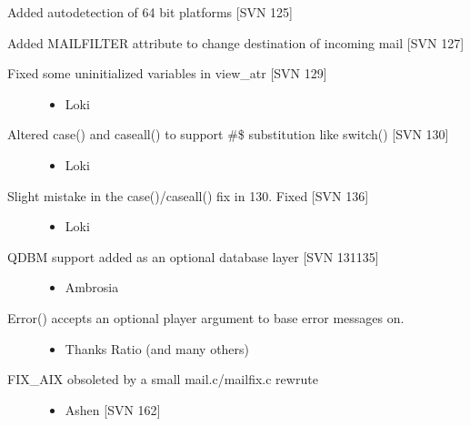 \documentclass[letterpaper,10pt,english]{sphinxmanual}
\begin{document}
\sphinxAtStartPar
Added auto\sphinxhyphen{}detection of 64 bit platforms {[}SVN 125{]}

\sphinxAtStartPar
Added MAILFILTER attribute to change destination of incoming mail {[}SVN 127{]}
\begin{description}
\item[{Fixed some uninitialized variables in view\_atr {[}SVN 129{]}}] \leavevmode\begin{itemize}
\item {} 
\sphinxAtStartPar
Loki

\end{itemize}

\item[{Altered case() and caseall() to support \#\$ substitution like switch() {[}SVN 130{]}}] \leavevmode\begin{itemize}
\item {} 
\sphinxAtStartPar
Loki

\end{itemize}

\item[{Slight mistake in the case()/caseall() fix in 130. Fixed {[}SVN 136{]}}] \leavevmode\begin{itemize}
\item {} 
\sphinxAtStartPar
Loki

\end{itemize}

\item[{QDBM support added as an optional database layer {[}SVN 131\sphinxhyphen{}135{]}}] \leavevmode\begin{itemize}
\item {} 
\sphinxAtStartPar
Ambrosia

\end{itemize}

\item[{Error() accepts an optional player argument to base error messages on.}] \leavevmode\begin{itemize}
\item {} 
\sphinxAtStartPar
Thanks Ratio (and many others)

\end{itemize}

\item[{FIX\_AIX obsoleted by a small mail.c/mailfix.c rewrute}] \leavevmode\begin{itemize}
\item {} 
\sphinxAtStartPar
Ashen {[}SVN 162{]}

\end{itemize}

\end{description}
\end{document}

